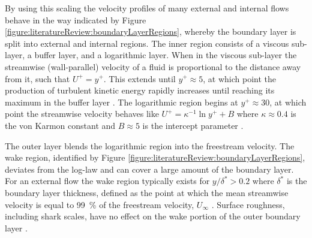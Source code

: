 \documentclass[12pt,oneside,a4paper]{article}
\begin{document}
By using this scaling the velocity profiles of many external and internal flows behave in the way indicated by Figure \ref{figure:literatureReview:boundaryLayerRegions}, whereby the boundary layer is split into external and internal regions. The inner region consists of a viscous sub-layer, a buffer layer, and a logarithmic layer. When in the viscous sub-layer the streamwise (wall-parallel) velocity of a fluid is proportional to the distance away from it, such that $U^+ = y^+$. This extends until $y^+ \approx 5$, at which point the production of turbulent kinetic energy rapidly increases until reaching its maximum in the buffer layer \citep{perlin2016}. The logarithmic region begins at $y^+ \approx 30$, at which point the streamwise velocity behaves like $U^+ = \kappa^{-1} \ln{y^+} + B$ where $\kappa \approx 0.4$ is the von Karmon constant and $B\approx 5$ is the intercept parameter \citep{pope2001}.

The outer layer blends the logarithmic region into the freestream velocity. The wake region, identified by Figure \ref{figure:literatureReview:boundaryLayerRegions}, deviates from the log-law and can cover a large amount of the boundary layer. For an external flow the wake region typically exists for $y/\delta^* > 0.2$ where $\delta^*$ is the boundary layer thickness, defined as the point at which the mean streamwise velocity is equal to \SI{99}{\%} of the freestream velocity, $U_\infty$ \citep{pope2001}. Surface roughness, including shark scales, have no effect on the wake portion of the outer boundary layer \citep{flack2010}.
\end{document}
